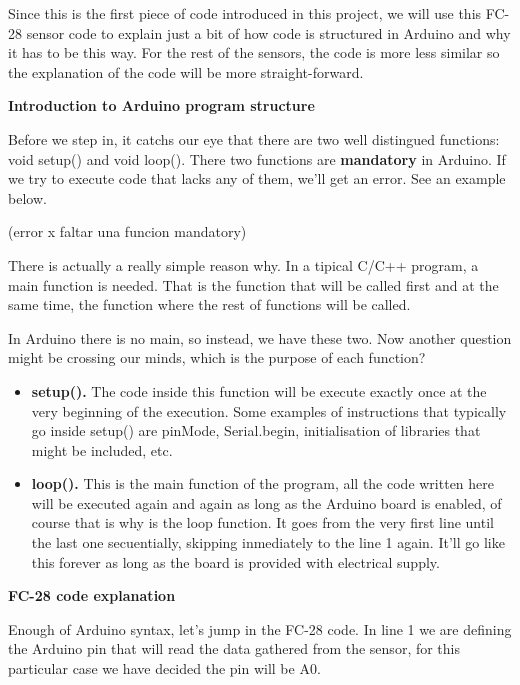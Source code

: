 Since this is the first piece of code introduced in this project, we will use this FC-28 sensor code to explain just a bit of how code is structured in Arduino and why it has to be this way. For the rest of the sensors, the code is more less similar so the explanation of the code will be more straight-forward.

\vspace{7mm}
\textbf{Introduction to Arduino program structure}

Before we step in, it catchs our eye that there are two well distingued functions: void setup() and void loop(). There two functions are \textbf{mandatory} in Arduino. If we try to execute code that lacks any of them, we'll get an error. See an example below.

(error x faltar una funcion mandatory)

There is actually a really simple reason why. In a tipical C/C++ program, a main function is needed. That is the function that will be called first and at the same time, the function where the rest of functions will be called.

In Arduino there is no main, so instead, we have these two. Now another question might be crossing our minds, which is the purpose of each function?

\begin{itemize}
	\item \textbf{setup().} The code inside this function will be execute exactly once at the very beginning of the execution. Some examples of instructions that typically go inside setup() are pinMode, Serial.begin, initialisation of libraries that might be included, etc.
	\item \textbf{loop().} This is the main function of the program, all the code written here will be executed again and again as long as the Arduino board is enabled, of course that is why is the loop function. It goes from the very first line until the last one secuentially, skipping inmediately to the line 1 again. It'll go like this forever as long as the board is provided with electrical supply.
\end{itemize}

\newpage

\textbf{FC-28 code explanation}

Enough of Arduino syntax, let's jump in the FC-28 code. In line 1 we are defining the Arduino pin that will read the data gathered from the sensor, for this particular case we have decided the pin will be A0.

